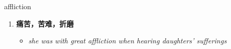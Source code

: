 
\begin{frame}
{\huge affliction}
\begin{center}
\begin{enumerate}\Large
  \item \textbf{痛苦，苦难，折磨}
  \begin{itemize}
    \item \em{\Large{she was with great affliction when hearing daughters' sufferings}}
  \end{itemize}
\end{enumerate}
\end{center}
\end{frame}
